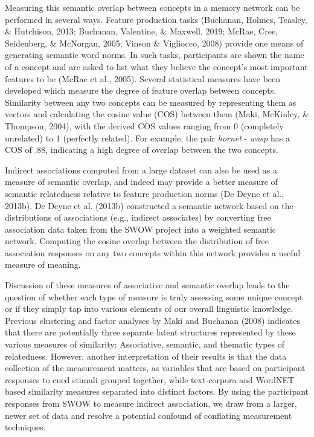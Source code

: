 \documentclass[english,,man]{apa6}
\begin{document}
Measuring this semantic overlap between concepts in a memory network can be performed in several ways. Feature production tasks (Buchanan, Holmes, Teasley, \& Hutchison, 2013; Buchanan, Valentine, \& Maxwell, 2019; McRae, Cree, Seidenberg, \& McNorgan, 2005; Vinson \& Vigliocco, 2008) provide one means of generating semantic word norms. In such tasks, participants are shown the name of a concept and are asked to list what they believe the concept's most important features to be (McRae et al., 2005). Several statistical measures have been developed which measure the degree of feature overlap between concepts. Similarity between any two concepts can be measured by representing them as vectors and calculating the cosine value (COS) between them (Maki, McKinley, \& Thompson, 2004), with the derived COS values ranging from 0 (completely unrelated) to 1 (perfectly related). For example, the pair \emph{hornet} - \emph{wasp} has a COS of .88, indicating a high degree of overlap between the two concepts.

Indirect associations computed from a large dataset can also be used as a measure of semantic overlap, and indeed may provide a better measure of semantic relatedness relative to feature production norms (De Deyne et al., 2013b). De Deyne et al. (2013b) constructed a semantic network based on the distributions of associations (e.g., indirect associates) by converting free association data taken from the SWOW project into a weighted semantic network. Computing the cosine overlap between the distribution of free association responses on any two concepts within this network provides a useful measure of meaning.

Discussion of these measures of associative and semantic overlap leads to the question of whether each type of measure is truly assessing some unique concept or if they simply tap into various elements of our overall linguistic knowledge. Previous clustering and factor analyses by Maki and Buchanan (2008) indicates that there are potentially three separate latent structures represented by these various measures of similarity: Associative, semantic, and thematic types of relatedness. However, another interpretation of their results is that the data collection of the measurement matters, as variables that are based on participant responses to cued stimuli grouped together, while text-corpora and WordNET based similarity measures separated into distinct factors. By using the participant responses from SWOW to measure indirect association, we draw from a larger, newer set of data and resolve a potential confound of conflating measurement techniques.
\end{document}
